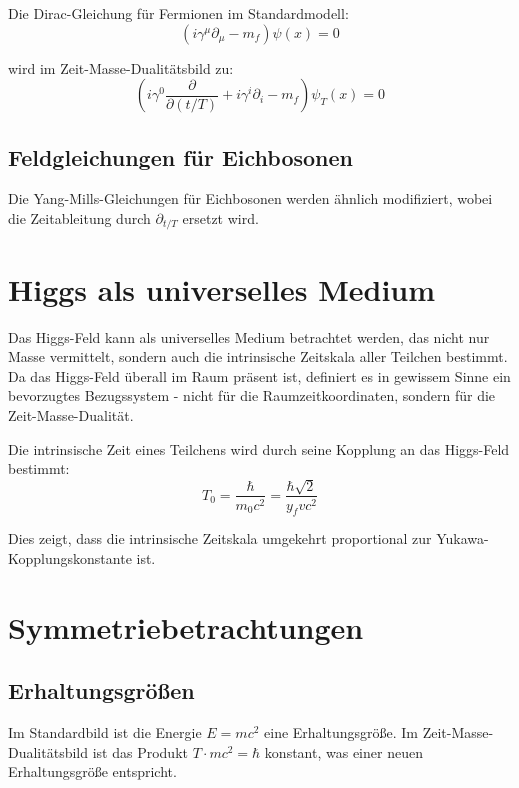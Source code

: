 \documentclass[a4paper,12pt]{article}
\begin{document}
	Die Dirac-Gleichung für Fermionen im Standardmodell:
	\begin{equation}
		(i\gamma^\mu\partial_\mu - m_f) \psi(x) = 0
	\end{equation}
	
	wird im Zeit-Masse-Dualitätsbild zu:
	\begin{equation}
		\left(i\gamma^0\frac{\partial}{\partial(t/T)} + i\gamma^i\partial_i - m_f\right) \psi_T(x) = 0
	\end{equation}
	
	\subsection{Feldgleichungen für Eichbosonen}
	
	Die Yang-Mills-Gleichungen für Eichbosonen werden ähnlich modifiziert, wobei die Zeitableitung durch $\partial_{t/T}$ ersetzt wird.
	
	\section{Higgs als universelles Medium}
	
	Das Higgs-Feld kann als universelles Medium betrachtet werden, das nicht nur Masse vermittelt, sondern auch die intrinsische Zeitskala aller Teilchen bestimmt. Da das Higgs-Feld überall im Raum präsent ist, definiert es in gewissem Sinne ein bevorzugtes Bezugssystem - nicht für die Raumzeitkoordinaten, sondern für die Zeit-Masse-Dualität.
	
	Die intrinsische Zeit eines Teilchens wird durch seine Kopplung an das Higgs-Feld bestimmt:
	\begin{equation}
		T_0 = \frac{\hbar}{m_0 c^2} = \frac{\hbar \sqrt{2}}{y_f v c^2}
	\end{equation}
	
	Dies zeigt, dass die intrinsische Zeitskala umgekehrt proportional zur Yukawa-Kopplungskonstante ist.
	
	\section{Symmetriebetrachtungen}
	
	\subsection{Erhaltungsgrößen}
	
	Im Standardbild ist die Energie $E = mc^2$ eine Erhaltungsgröße. Im Zeit-Masse-Dualitätsbild ist das Produkt $T \cdot m c^2 = \hbar$ konstant, was einer neuen Erhaltungsgröße entspricht.
	
\end{document}
